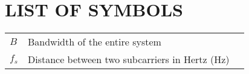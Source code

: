\section*{LIST OF SYMBOLS}
 {}

\begin{tabularx}{0.9\textwidth}{ L{0.4} L{1.3} L{1.3} }
    $B$     & Bandwidth of the entire system \\ %
    $f_s$   & Distance between two subcarriers in Hertz (Hz) \\
\end{tabularx}

\newpage